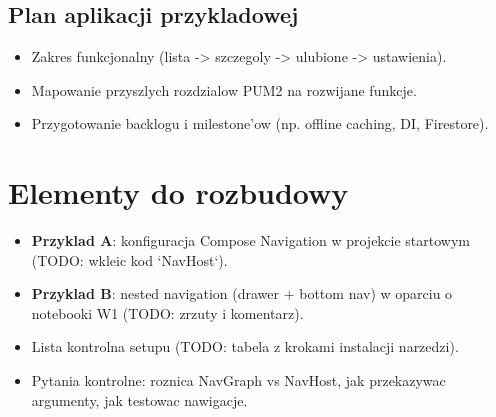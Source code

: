 \subsection{Plan aplikacji przykladowej}
\begin{itemize}
  \item Zakres funkcjonalny (lista -> szczegoly -> ulubione -> ustawienia).
  \item Mapowanie przyszlych rozdzialow PUM2 na rozwijane funkcje.
  \item Przygotowanie backlogu i milestone'ow (np. offline caching, DI, Firestore).
\end{itemize}

\section{Elementy do rozbudowy}
\begin{itemize}
  \item \textbf{Przyklad A}: konfiguracja Compose Navigation w projekcie startowym (TODO: wkleic kod `NavHost`).
  \item \textbf{Przyklad B}: nested navigation (drawer + bottom nav) w oparciu o notebooki W1 (TODO: zrzuty i komentarz).
  \item Lista kontrolna setupu (TODO: tabela z krokami instalacji narzedzi).
  \item Pytania kontrolne: roznica NavGraph vs NavHost, jak przekazywac argumenty, jak testowac nawigacje.
\end{itemize}

